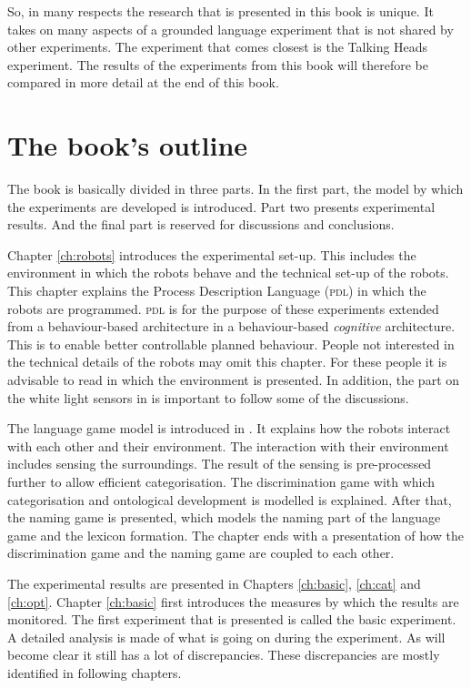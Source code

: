 So, in many respects the research that is presented in this book is unique. It takes on many aspects of a grounded language experiment that is not shared by other experiments. The experiment that comes closest is the Talking Heads experiment. The results of the experiments from this book will therefore be compared in more detail at the end of this book.


\section{The book's outline}

The book is basically divided in three parts. In the first part, the model by which the experiments are developed is introduced. Part two presents experimental results. And the final part is reserved for discussions and conclusions.


Chapter \ref{ch:robots} introduces the experimental set-up. This includes the environment in which the robots behave and the technical set-up of the robots. This chapter explains the Process Description Language (\textsc{pdl}) in which the robots are programmed. \textsc{pdl} is for the purpose of these experiments extended from a behaviour-based architecture in a behaviour-based {\em cognitive} architecture. This is to enable better controllable planned behaviour. People not interested in the technical details of the robots may omit this chapter. For these people it is advisable to read  in which the environment is presented. In addition, the part on the white light sensors in  is important to follow some of the discussions.

The language game model is introduced in . It explains how the robots interact with each other and their environment. The interaction with their environment includes sensing the surroundings. The result of the sensing is pre-processed further to allow efficient categorisation. The discrimination game with which categorisation and ontological development is modelled is explained. After that, the naming game is presented, which models the naming part of the language game and the lexicon formation. The chapter ends with a presentation of how the discrimination game and the naming game are coupled to each other.


The experimental results are presented in Chapters \ref{ch:basic}, \ref{ch:cat} and \ref{ch:opt}. Chapter \ref{ch:basic} first introduces the measures by which the results are monitored. The first experiment that is presented is called the {\sc basic experiment}. A detailed analysis is made of what is going on during the experiment. As will become clear it still has a lot of discrepancies. These discrepancies are mostly identified in following chapters. 

